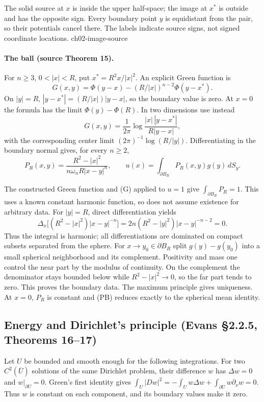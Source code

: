 {The solid source at $x$ is inside the upper half-space; the image at $x^*$ is outside and has the opposite sign. Every boundary point $y$ is equidistant from the pair, so their potentials cancel there. The labels indicate source signs, not signed coordinate locations.}
{ch02-image-source}

\paragraph{The ball (source Theorem 15).}
For $n\geq3$, $0<|x|<R$, put $x^*=R^2x/|x|^2$. An explicit Green function is
\[
 G(x,y)=\Phi(y-x)-(R/|x|)^{n-2}\Phi(y-x^*).
\]
On $|y|=R$, $|y-x^*|=(R/|x|)|y-x|$, so the boundary value is zero.
At $x=0$ the formula has the limit $\Phi(y)-\Phi(R)$.
In two dimensions use instead
\[
 G(x,y)=\frac1{2\pi}
 \log\frac{|x|\,|y-x^*|}{R|y-x|},
\]
with the corresponding center limit $(2\pi)^{-1}\log(R/|y|)$.
Differentiating in the boundary normal gives, for every $n\geq2$,
\[
 P_R(x,y)=\frac{R^2-|x|^2}{n\omega_n R|x-y|^n},
 \qquad
 u(x)=\int_{\partial B_R}P_R(x,y)g(y)\,dS_y.
 \tag{PB}
\]
\begin{expandedproof}
The constructed Green function and (G) applied to $u=1$ give
$\int_{\partial B_R}P_R=1$. This uses a known constant harmonic function,
so does not assume existence for arbitrary data.
For $|y|=R$, direct differentiation yields
\[
 \Delta_x\big[(R^2-|x|^2)|x-y|^{-n}\big]
 =2n(R^2-|y|^2)|x-y|^{-n-2}=0.
\]
Thus the integral is harmonic; all differentiations are dominated
on compact subsets separated from the sphere.
For $x\to y_0\in\partial B_R$ split $g(y)-g(y_0)$ into a small spherical
neighborhood and its complement. Positivity and mass one control the
near part by the modulus of continuity. On the complement the denominator
stays bounded below while $R^2-|x|^2\to0$, so the far part tends to zero.
This proves the boundary data. The maximum principle gives uniqueness.
At $x=0$, $P_R$ is constant and (PB) reduces exactly to the spherical
mean identity.
\end{expandedproof}
\Needspace{45mm}

\subsection{Energy and Dirichlet's principle (Evans \S2.2.5, Theorems 16--17)}
Let $U$ be bounded and smooth enough for the following integrations.
For two $C^2(\overline U)$ solutions of the same Dirichlet problem,
their difference $w$ has $\Delta w=0$ and $w|_{\partial U}=0$.
Green's first identity gives
$\int_U|Dw|^2=-\int_Uw\Delta w+\int_{\partial U}w\partial_\nu w=0$.
Thus $w$ is constant on each component, and its boundary values make it zero.

